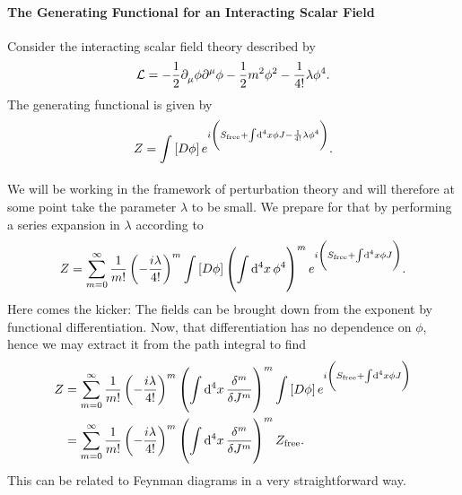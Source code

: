 \paragraph{The Generating Functional for an Interacting Scalar Field}
Consider the interacting scalar field theory described by
\begin{align*}
	\mathcal{L} = -\frac{1}{2}\partial^{}_{\mu}\phi\partial^{\mu}_{}\phi - \frac{1}{2}m^{2}\phi^{2} - \frac{1}{4!}\lambda\phi^{4}.
\end{align*}
The generating functional is given by
\begin{align*}
	Z = \int\limits_{}\left[D\phi\right]e^{i\left(S_{\text{free}} + \int\limits_{}^{}\dd[4]{x}\phi J - \frac{1}{4!}\lambda\phi^{4}\right)}.
\end{align*}
We will be working in the framework of perturbation theory and will therefore at some point take the parameter $\lambda$ to be small. We prepare for that by performing a series expansion in $\lambda$ according to
\begin{align*}
	Z = \sum\limits_{m = 0}^{\infty}\frac{1}{m!}\left(-\frac{i\lambda}{4!}\right)^{m}\int\limits_{}\left[D\phi\right]\left(\int\limits_{}^{}\dd[4]{x}\phi^{4}\right)^{m}e^{i\left(S_{\text{free}} + \int\limits_{}^{}\dd[4]{x}\phi J\right)}.
\end{align*}
Here comes the kicker: The fields can be brought down from the exponent by functional differentiation. Now, that differentiation has no dependence on $\phi$, hence we may extract it from the path integral to find
\begin{align*}
	Z &= \sum\limits_{m = 0}^{\infty}\frac{1}{m!}\left(-\frac{i\lambda}{4!}\right)^{m}\left(\integ[4]{}{}{x}{\fdv[m]{J}\right)^{m}}\pinte{}{\phi}e^{i\left(S_{\text{free}} + \integ[4]{}{}{x}{\phi J}\right)} \\
	  &= \sum\limits_{m = 0}^{\infty}\frac{1}{m!}\left(-\frac{i\lambda}{4!}\right)^{m}\left(\integ[4]{}{}{x}{\fdv[m]{J}\right)^{m}}Z_{\text{free}}.
\end{align*}
This can be related to Feynman diagrams in a very straightforward way.

